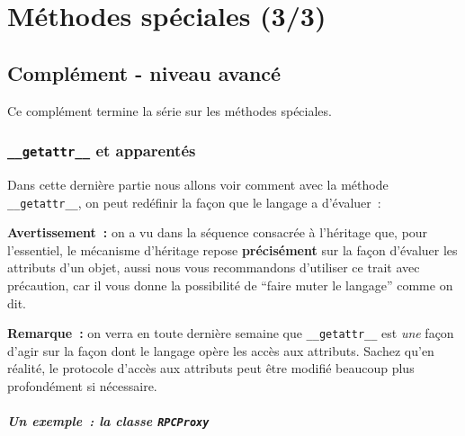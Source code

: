     
    
    
    

    

    \hypertarget{muxe9thodes-spuxe9ciales-33}{%
\section{Méthodes spéciales (3/3)}\label{muxe9thodes-spuxe9ciales-33}}

    \hypertarget{compluxe9ment---niveau-avancuxe9}{%
\subsection{Complément - niveau
avancé}\label{compluxe9ment---niveau-avancuxe9}}

    Ce complément termine la série sur les méthodes spéciales.

    \hypertarget{getattr__-et-apparentuxe9s}{%
\subsubsection{\texorpdfstring{\texttt{\_\_getattr\_\_} et
apparentés}{\_\_getattr\_\_ et apparentés}}\label{getattr__-et-apparentuxe9s}}

    Dans cette dernière partie nous allons voir comment avec la méthode
\texttt{\_\_getattr\_\_}, on peut redéfinir la façon que le langage a
d'évaluer~:

\begin{Shaded}
\begin{Highlighting}[frame=lines,framerule=0.6mm,rulecolor=\color{asisframecolor}]
\end{Highlighting}
\end{Shaded}

    \textbf{Avertissement~:} on a vu dans la séquence consacrée à l'héritage
que, pour l'essentiel, le mécanisme d'héritage repose
\textbf{précisément} sur la façon d'évaluer les attributs d'un objet,
aussi nous vous recommandons d'utiliser ce trait avec précaution, car il
vous donne la possibilité de ``faire muter le langage'' comme on dit.

    \textbf{Remarque~:} on verra en toute dernière semaine que
\texttt{\_\_getattr\_\_} est \emph{une} façon d'agir sur la façon dont
le langage opère les accès aux attributs. Sachez qu'en réalité, le
protocole d'accès aux attributs peut être modifié beaucoup plus
profondément si nécessaire.

    \hypertarget{un-exemple-la-classe-rpcproxy}{%
\subparagraph{\texorpdfstring{Un exemple~: la classe
\texttt{RPCProxy}}{Un exemple~: la classe RPCProxy}}\label{un-exemple-la-classe-rpcproxy}}

